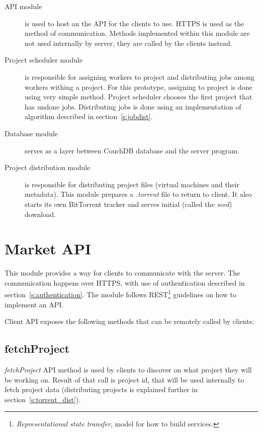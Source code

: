 \begin{description}

\item[API module] is used to host an the API for the clients to use. HTTPS is used as the method of communication. Methods implemented within this module are not used internally by server, they are called by the clients instead.

\item[Project scheduler module] is responsible for assigning workers to project and distributing jobs among workers withing a project. For this prototype, assigning to project is done using very simple method. Project scheduler chooses the first project that has undone jobs. Distributing jobs is done using an implementation of algorithm described in section~\ref{s:jobdist}.

\item[Database module] serves as a layer between CouchDB database and the server program.

\item[Project distribution module] is responsible for distributing project files (virtual machines and their metadata). This module prepares a \emph{.torrent} file to return to client. It also starts its own BitTorrent tracker and serves initial (called the \emph{seed}) download.

\end{description}

\section{Market API}
\label{s:cliapi}

This module provides a way for clients to communicate with the server. The communication happens over HTTPS, with use of authentication described in section~\ref{s:authentication}. The module follows REST\footnote{\emph{Representational state transfer}, model for how to build services.} guidelines on how to implement an API.

Client API exposes the following methods that can be remotely called by clients:

\subsection{fetchProject}

\emph{fetchProject} API method is used by clients to discover on what project they will be working on. Result of that call is project id, that will be used internally to fetch project data (distributing projects is explained further in section~\ref{s:torrent_dist}).

